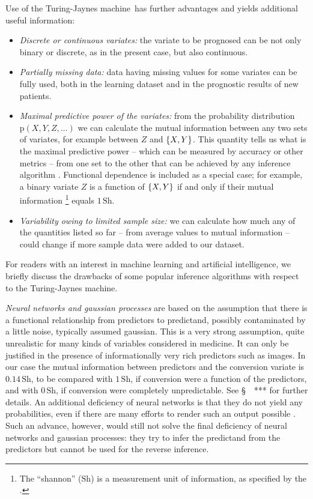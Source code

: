 \documentclass[utf8]{FrontiersinHarvard} %
\newcommand*{\pencil}{{\fontencoding{U}\fontfamily{fontawesometwo}\selectfont\symbol{210}}}
\newcommand{\mynotep}[1]{{\color{notecolour}\pencil\ #1}}
\newcommand*{\sect}{\S}%
\DeclarePairedDelimiter\set{\{}{\}} %
\newcommand*{\p}{\mathrm{p}}%
\renewcommand*{\|}[1][]{\nonscript\:#1\vert\nonscript\:\mathopen{}}
\newcommand*{\tjm}{Turing-Jaynes machine}
\begin{document}
Use of the \tjm\ has further advantages and yields additional useful information:
\begin{itemize}
\item \emph{Discrete or continuous variates:} the variate to be prognosed can be not only binary or discrete, as in the present case, but also continuous.
\item \emph{Partially missing data:} data having missing values for some variates can be fully used, both in the learning dataset and in the prognostic results of new patients.
\item \emph{Maximal predictive power of the variates:} from the probability distribution $\p(X,Y,Z,\dotsc)$ we can calculate the mutual information between any two sets of variates, for example between $Z$ and $\set{X,Y}$. This quantity tells us what is the maximal predictive power -- which can be measured by accuracy or other metrics -- from one set to the other that can be achieved by any inference algorithm \citep{mackay1995_r2005,goodetal1968,coveretal1991_r2006}. Functional dependence is included as a special case; for example, a binary variate $Z$ is a function of $\set{X,Y}$ if and only if their mutual information \footnote{The \enquote{shannon} ($\mathrm{Sh}$) is a measurement unit of information, as specified by the \cite{iso2008c}.} equals $1\,\mathrm{Sh}$.
\item \emph{Variability owing to limited sample size:} we can calculate how much any of the quantities listed so far -- from average values to mutual information -- could change if more sample data were added to our dataset.
\end{itemize}

\medskip

For readers with an interest in machine learning and artificial intelligence, we briefly discuss the drawbacks of some popular inference algorithms with respect to the \tjm.

\emph{Neural networks and gaussian processes} are based on the assumption that there is a functional relationship from predictors to predictand,
possibly contaminated by a little noise, typically assumed gaussian. This is a very strong assumption, quite unrealistic for many kinds of variables considered in medicine. It can only be justified in the presence of informationally very rich predictors such as images. In our case the mutual information between predictors and the conversion variate is $0.14\,\mathrm{Sh}$, to be compared with $1\,\mathrm{Sh}$, if conversion were a function of the predictors, and with $0\,\mathrm{Sh}$, if conversion were completely unpredictable. See \sect~\mynotep{***} for further details. An additional deficiency of neural networks is that they do not yield any probabilities, even if there are many efforts to render such an output possible \citep{pearceetal2020,osbandetal2021,backetal2019}. Such an advance, however, would still not solve the final deficiency of neural networks and gaussian processes: they try to infer the predictand from the predictors but cannot be used for the reverse inference.
\end{document}
